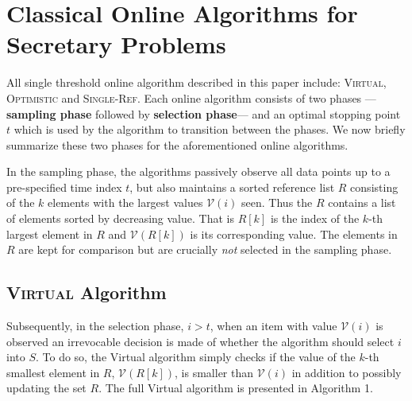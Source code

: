\clearpage


\section{Classical Online Algorithms for Secretary Problems}
\label{appendix:classical_online_algorithms}

All single threshold online algorithm described in this paper include: \textsc{Virtual}, \textsc{Optimistic} and \textsc{Single-Ref}. Each online algorithm consists of two phases ---\textbf{sampling phase} followed by \textbf{selection phase}--- and an optimal stopping point $t$ which is used by the algorithm to transition between the phases. We now briefly summarize these two phases for the aforementioned online algorithms. 

In the sampling phase, the algorithms passively observe all data points up to a pre-specified time index $t$, but also maintains a sorted reference list $R$ consisting of the $k$ elements with the largest values $\mathcal{V}(i)$ seen. Thus the $R$ contains a list of elements sorted by decreasing value. That is $R[k]$ is the index of the $k$-th largest element in $R$ and $\mathcal{V}(R[k])$ is its corresponding value. The elements in $R$ are kept for comparison but are crucially \textit{not} selected in the sampling phase.

\subsection{\textsc{Virtual} Algorithm}

Subsequently, in the selection phase, $i > t$, when an item with value $\mathcal{V}(i)$ is observed an irrevocable decision is made of whether the algorithm should select $i$ into $S$. To do so, the Virtual algorithm simply checks if the value of the $k$-th smallest element in $R$, $\mathcal{V}(R[k])$, is smaller than $\mathcal{V}(i)$ in addition to possibly updating the set $R$. The full Virtual algorithm is presented in Algorithm 1.

